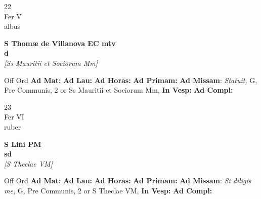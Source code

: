 \documentclass[10pt, openany]{book}
\begin{document}
    \begin{center}
        \begin{minipage}{3.5in}
            \vspace{2em}
            \begin{minipage}{0.5in}
                {\Huge 22} \\
                {\normalsize Fer V} \\
                {\normalsize albus}
            \end{minipage}
            \begin{minipage}{3.0in}
                \textbf{ \large S Thomæ de Villanova EC mtv \\
                \textnormal{\normalsize d}} \\ \textit{[Ss Mauritii et Sociorum Mm]} \\ 
            \end{minipage}
            \begin{justify}Off Ord
                \textbf{Ad Mat: }
                \textbf{Ad Lau: }
                \textbf{Ad Horas: }
                \textbf{Ad Primam: }\textbf{Ad Missam}: \textit{Statuit,} G, Pre Communis, 2 or Ss Mauritii et Sociorum Mm,  
                \textbf{In Vesp: }
                \textbf{Ad Compl: }
            \end{justify}
        \end{minipage}
    \end{center}

    \begin{center}
        \begin{minipage}{3.5in}
            \vspace{2em}
            \begin{minipage}{0.5in}
                {\Huge 23} \\
                {\normalsize Fer VI} \\
                {\normalsize ruber}
            \end{minipage}
            \begin{minipage}{3.0in}
                \textbf{ \large S Lini PM \\
                \textnormal{\normalsize sd}} \\ \textit{[S Theclae VM]} \\ 
            \end{minipage}
            \begin{justify}Off Ord
                \textbf{Ad Mat: }
                \textbf{Ad Lau: }
                \textbf{Ad Horas: }
                \textbf{Ad Primam: }\textbf{Ad Missam}: \textit{Si diligis me,} G, Pre Communis, 2 or S Theclae VM,  
                \textbf{In Vesp: }
                \textbf{Ad Compl: }
            \end{justify}
        \end{minipage}
    \end{center}
\end{document}
